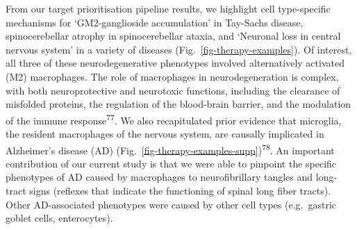 \documentclass[
]{article}
\begin{document}
From our target prioritisation pipeline results, we highlight cell
type-specific mechanisms for `GM2-ganglioside accumulation' in Tay-Sachs
disease, spinocerebellar atrophy in spinocerebellar ataxia, and
`Neuronal loss in central nervous system' in a variety of diseases
(Fig.~\ref{fig-therapy-examples}). Of interest, all three of these
neurodegenerative phenotypes involved alternatively activated (M2)
macrophages. The role of macrophages in neurodegeneration is complex,
with both neuroprotective and neurotoxic functions, including the
clearance of misfolded proteins, the regulation of the blood-brain
barrier, and the modulation of the immune response\textsuperscript{77}.
We also recapitulated prior evidence that microglia, the resident
macrophages of the nervous system, are causally implicated in
Alzheimer's disease (AD)
(Fig.~\ref{fig-therapy-examples-supp})\textsuperscript{78}. An important
contribution of our current study is that we were able to pinpoint the
specific phenotypes of AD caused by macrophages to neurofibrillary
tangles and long-tract signs (reflexes that indicate the functioning of
spinal long fiber tracts). Other AD-associated phenotypes were caused by
other cell types (e.g.~gastric goblet cells, enterocytes).
\end{document}
